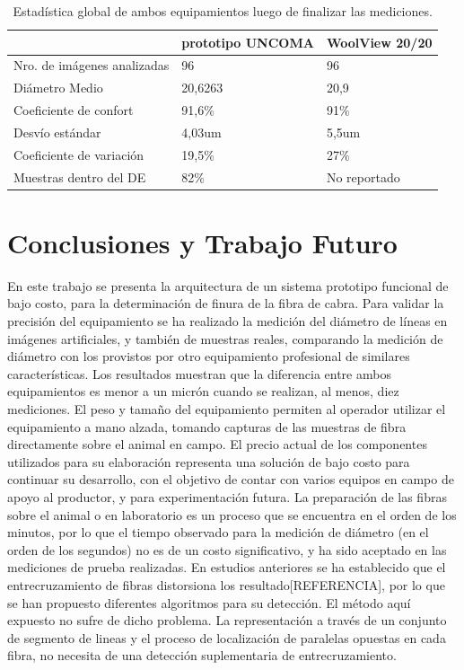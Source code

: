 \documentclass[runningheads,a4paper]{llncs}
\begin{document}
\begin{table}[htbp]
\begin{center}
\begin{tabular}{|l|l|l|}
\hline
& prototipo UNCOMA & WoolView 20/20 \\
\hline \hline \hline
Nro. de imágenes analizadas & 96 & 96 \\ \hline
Diámetro Medio & 20,6263 & 20,9 \\ \hline
Coeficiente de confort & 91,6\% & 91\% \\ \hline
Desvío estándar & 4,03um & 5,5um \\ \hline
Coeficiente de variación & 19,5\% & 27\% \\ \hline
Muestras dentro del DE & 82\% & No reportado \\ \hline
\end{tabular}
\caption{Estadística global de ambos equipamientos luego de finalizar las mediciones.}
\label{tabla:sencilla}
\end{center}
\end{table}


\section{Conclusiones y Trabajo Futuro} \label{sec:conc}
En este trabajo se presenta la arquitectura de un sistema prototipo funcional
de bajo costo, para la determinación de finura de la fibra de cabra.
Para validar la precisión del equipamiento se ha realizado la medición
del diámetro de líneas en imágenes artificiales, y también de 
muestras reales, comparando la medición de diámetro con los provistos por
otro equipamiento profesional de similares características. Los resultados
muestran que la diferencia entre ambos equipamientos es menor a un micrón cuando se realizan, al menos, diez mediciones.
El peso y tamaño del equipamiento permiten al operador 
utilizar el equipamiento a mano alzada, tomando capturas de las muestras 
de fibra directamente sobre el animal en campo.
El precio actual de los componentes utilizados para su elaboración representa
una solución de bajo costo para continuar su desarrollo, con el objetivo de
contar con varios equipos en campo de apoyo al productor, y para experimentación futura.
La preparación de las fibras sobre el animal o en laboratorio es un proceso que se encuentra en el orden de los minutos, por lo que el tiempo observado para la medición de diámetro (en el orden de los segundos) no es de un costo significativo, y ha sido aceptado en las mediciones de prueba realizadas.
En estudios anteriores se ha establecido que el entrecruzamiento de fibras distorsiona los resultado[REFERENCIA], por lo que se han propuesto diferentes algoritmos para su detección.
El método aquí expuesto no sufre de dicho problema. 
La representación a través de un conjunto de segmento de lineas y el proceso de localización de paralelas opuestas en cada fibra, no necesita de una detección suplementaria de entrecruzamiento. 
\end{document}
